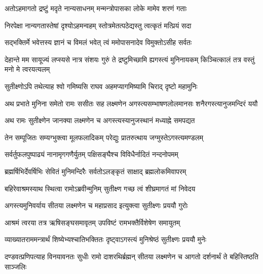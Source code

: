 \twolineshloka
{अतोऽहमागतो द्रष्टुं मदृते नान्यसाधनम्}
{मन्मन्त्रोपासका लोके मामेव शरणं गताः} %

\twolineshloka
{निरपेक्षा नान्यगतास्तेषां दृश्योऽहमन्वहम्}
{स्तोत्रमेतत्पठेद्यस्तु त्वत्कृतं मत्प्रियं सदा} %

\twolineshloka
{सद्भक्तिर्मे भवेत्तस्य ज्ञानं च विमलं भवेत्}
{त्वं ममोपासनादेव विमुक्तोऽसीह सर्वतः} %

\threelineshloka
{देहान्ते मम सायूज्यं लप्स्यसे नात्र संशयः}
{गुरुं ते द्रष्टुमिच्छामि ह्यगस्त्यं मुनिनायकम्}
{किञ्चित्कालं तत्र वस्तुं मनो मे त्वरयत्यलम्} %

\twolineshloka
{सुतीक्ष्णोऽपि तथेत्याह श्वो गमिष्यसि राघव}
{अहमप्यागमिष्यामि चिराद् दृष्टो महामुनिः} %

\fourlineindentedshloka
{अथ प्रभाते मुनिना समेतो}
{रामः ससीतः सह लक्ष्मणेन}
{अगस्त्यसम्भाषणलोलमानसः}
{शनैरगस्त्यानुजमन्दिरं ययौ} %





\twolineshloka
{अथ रामः सुतीक्ष्णेन जानक्या लक्ष्मणेन च}
{अगस्त्यस्यानुजस्थानं मध्याह्ने समपद्यत} %

\twolineshloka
{तेन सम्पूजितः सम्यग्भुक्त्वा मूलफलादिकम्}
{परेद्युः प्रातरुत्थाय जग्मुस्तेऽगस्त्यमण्डलम्} %

\twolineshloka
{सर्वर्तुफलपुष्पाढ्यं नानामृगगणैर्युतम्}
{पक्षिसङ्घैश्च विविधैर्नादितं नन्दनोपमम्} %

\twolineshloka
{ब्रह्मर्षिभिर्देवर्षिभिः सेवितं मुनिमन्दिरैः}
{सर्वतोऽलङ्कृतं साक्षाद् ब्रह्मलोकमिवापरम्} %

\twolineshloka
{बहिरेवाश्रमस्याथ स्थित्वा रामोऽब्रवीन्मुनिम्}
{सुतीक्ष्ण गच्छ त्वं शीघ्रमागतं मां निवेदय} %

\twolineshloka
{अगस्त्यमुनिवर्याय सीतया लक्ष्मणेन च}
{महाप्रसाद इत्युक्त्वा सुतीक्ष्णः प्रययौ गुरोः} %

\twolineshloka
{आश्रमं त्वरया तत्र ऋषिसङ्घसमावृतम्}
{उपविष्टं रामभक्तैर्विशेषेण समायुतम्} %

\twolineshloka
{व्याख्यातराममन्त्रार्थं शिष्येभ्यश्चातिभक्तितः}
{दृष्ट्वाऽगस्त्यं मुनिश्रेष्ठं सुतीक्ष्णः प्रययौ मुनेः} %

\threelineshloka
{दण्डवत्प्रणिपत्याह विनयावनतः सुधीः}
{रामो दाशरथिर्ब्रह्मन् सीतया लक्ष्मणेन च}
{आगतो दर्शनार्थं ते बहिस्तिष्ठति साञ्जलिः} %


